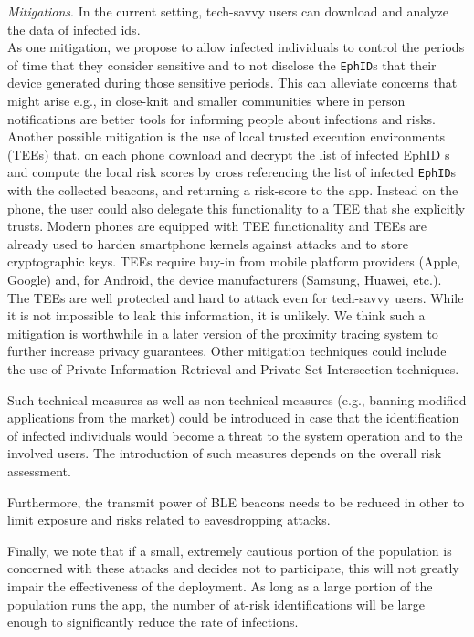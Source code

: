 \documentclass[10.8pt,a4paper]{article}
\begin{document}
\textit{Mitigations}. In the current setting, tech-savvy users can download and analyze the data of infected ids.\\
As one mitigation, we propose to allow infected individuals to control the periods of time that they consider sensitive and to not disclose the \texttt{EphID}s that their device generated during those sensitive periods. This can alleviate concerns that might arise e.g., in close-knit and  smaller communities where in person notifications are better tools for informing people about infections and risks.\\
Another possible mitigation is the use of local trusted execution environments (TEEs) that, on each phone download and decrypt the list of infected EphID s and compute the local risk scores by cross referencing the list of infected \texttt{EphID}s with the collected beacons, and returning a risk-score to the app. Instead on the phone, the user could also delegate this functionality to a TEE that she explicitly trusts. Modern phones are equipped with TEE functionality and TEEs are already used to harden smartphone kernels against attacks and to store cryptographic keys. TEEs require buy-in from mobile platform providers (Apple, Google) and, for Android, the device manufacturers (Samsung, Huawei, etc.). The TEEs are well protected and hard to attack even for tech-savvy users. While it is not impossible to leak this information, it is unlikely. We think such a mitigation is worthwhile in a later version of the proximity tracing system to further increase privacy guarantees. Other mitigation techniques could include the use of Private Information Retrieval and Private Set Intersection techniques.

Such technical measures as well as non-technical measures (e.g., banning modified
applications from the market) could be introduced in case that the identification of infected individuals would become a threat to the system operation and to the involved users. The introduction of such measures depends on the overall risk assessment.

Furthermore, the transmit power of BLE beacons needs to be reduced in other to limit
exposure and risks related to eavesdropping attacks.

Finally, we note that if a small, extremely cautious portion of the population is concerned with these attacks and decides not to participate, this will not greatly impair the effectiveness of the deployment. As long as a large portion of the population runs the app, the number of at-risk identifications will be large enough to significantly reduce the rate of infections.
\end{document}
